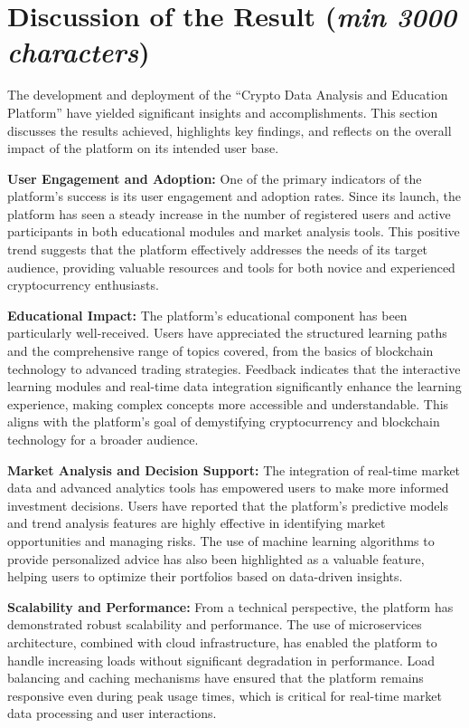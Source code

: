 \documentclass[12pt]{report}
\newcommand{\characters}[1]{(\textit{min #1 characters})}
\begin{document}
\section{Discussion of the Result \characters{3000}}
The development and deployment of the “Crypto Data Analysis and Education Platform” have yielded significant insights and accomplishments. This section discusses the results achieved, highlights key findings, and reflects on the overall impact of the platform on its intended user base.

\textbf{User Engagement and Adoption:} One of the primary indicators of the platform’s success is its user engagement and adoption rates. Since its launch, the platform has seen a steady increase in the number of registered users and active participants in both educational modules and market analysis tools. This positive trend suggests that the platform effectively addresses the needs of its target audience, providing valuable resources and tools for both novice and experienced cryptocurrency enthusiasts.

\textbf{Educational Impact:} The platform’s educational component has been particularly well-received. Users have appreciated the structured learning paths and the comprehensive range of topics covered, from the basics of blockchain technology to advanced trading strategies. Feedback indicates that the interactive learning modules and real-time data integration significantly enhance the learning experience, making complex concepts more accessible and understandable. This aligns with the platform’s goal of demystifying cryptocurrency and blockchain technology for a broader audience.

\textbf{Market Analysis and Decision Support:} The integration of real-time market data and advanced analytics tools has empowered users to make more informed investment decisions. Users have reported that the platform’s predictive models and trend analysis features are highly effective in identifying market opportunities and managing risks. The use of machine learning algorithms to provide personalized advice has also been highlighted as a valuable feature, helping users to optimize their portfolios based on data-driven insights.

\textbf{Scalability and Performance:} From a technical perspective, the platform has demonstrated robust scalability and performance. The use of microservices architecture, combined with cloud infrastructure, has enabled the platform to handle increasing loads without significant degradation in performance. Load balancing and caching mechanisms have ensured that the platform remains responsive even during peak usage times, which is critical for real-time market data processing and user interactions.
\end{document}
